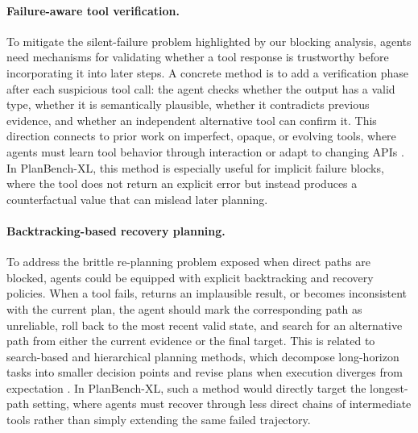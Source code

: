 \documentclass{llmxive}
\providecommand{\bench}[1]{PlanBench-XL}
\begin{document}
\paragraph{Failure-aware tool verification.}
To mitigate the silent-failure problem highlighted by our blocking analysis, agents need mechanisms for validating whether a tool response is trustworthy before incorporating it into later steps. 
A concrete method is to add a verification phase after each suspicious tool call: the agent checks whether the output has a valid type, whether it is semantically plausible, whether it contradicts previous evidence, and whether an independent alternative tool can confirm it. 
This direction connects to prior work on imperfect, opaque, or evolving tools, where agents must learn tool behavior through interaction or adapt to changing APIs \citep{OpaqueToolsBench,ToolSandbox, acikgoz2026toolr0}. 
In \bench{}, this method is especially useful for implicit failure blocks, where the tool does not return an explicit error but instead produces a counterfactual value that can mislead later planning.

\paragraph{Backtracking-based recovery planning.}
To address the brittle re-planning problem exposed when direct paths are blocked, agents could be equipped with explicit backtracking and recovery policies. 
When a tool fails, returns an implausible result, or becomes inconsistent with the current plan, the agent should mark the corresponding path as unreliable, roll back to the most recent valid state, and search for an alternative path from either the current evidence or the final target. This is related to search-based and hierarchical planning methods, which decompose long-horizon tasks into smaller decision points and revise plans when execution diverges from expectation \citep{AnyTool,verma2025leap,koh2026tree}. In \bench{}, such a method would directly target the longest-path setting, where agents must recover through less direct chains of intermediate tools rather than simply extending the same failed trajectory.
\end{document}

